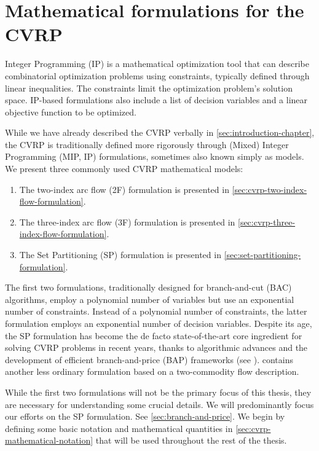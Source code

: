 \chapter{Mathematical formulations for the CVRP}
\label{sec:cvrp-mathematical-formulations}

Integer Programming (IP) is a mathematical optimization tool
that can describe combinatorial optimization problems
using constraints, typically defined through linear inequalities.
The constraints limit the optimization problem's solution space.
IP-based formulations also include a list of decision variables
and a linear objective function to be optimized.

\medskip

While we have already described the CVRP verbally in \cref{sec:introduction-chapter},
the CVRP is traditionally defined more rigorously through
(Mixed) Integer Programming (MIP, IP) formulations,
sometimes also known simply as models.
We present three commonly used CVRP mathematical models:
\begin{enumerate}
	\setlength{\itemsep}{0pt}
	\setlength{\parskip}{0pt}

	\item The two-index arc flow (2F) formulation \parencite{laporte1983, laporte1985, laporte1986}
	      is presented in \cref{sec:cvrp-two-index-flow-formulation}.
	\item The three-index arc flow (3F) formulation \parencite{golden1977}
	      is presented in \cref{sec:cvrp-three-index-flow-formulation}.
	\item The Set Partitioning (SP) formulation \parencite{balinski1964}
	      is presented in \cref{sec:set-partitioning-formulation}.
\end{enumerate}

The first two formulations, traditionally designed
for branch-and-cut (BAC) algorithms, employ a polynomial number of variables
but use an exponential number of constraints.
Instead of a polynomial number of constraints,
the latter formulation employs an exponential number of decision variables.
Despite its age, the SP formulation has become the de facto state-of-the-art core ingredient
for solving CVRP problems in recent years,
thanks to algorithmic advances and the development of efficient branch-and-price (BAP) frameworks
(see \cite{pessoa2020}).
\Textcite{baldacci2004} contains another less ordinary formulation
based on a two-commodity flow description.

While the first two formulations will not be the primary focus of this thesis,
they are necessary for understanding some crucial details.
We will predominantly focus our efforts
on the SP formulation. See \cref{sec:branch-and-price}.
We begin by defining some basic notation and mathematical quantities in
\cref{sec:cvrp-mathematical-notation} that will be used throughout the rest of the thesis.


